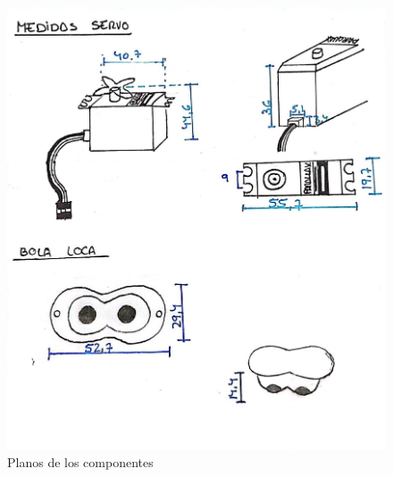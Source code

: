 \begin{figure}[ht!]
\begin{minipage}{0.45\linewidth}
		\includegraphics[width=\linewidth]{figs/cap5/planos4.jpeg}
		\caption*{\centering}
	\end{minipage}
	\caption{Planos de los componentes}
	\label{fig:planos}
\end{figure}


